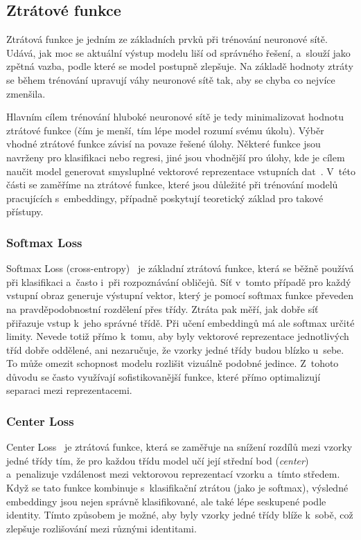 \subsection*{Ztrátové funkce}
Ztrátová funkce je jedním ze základních prvků při trénování neuronové sítě. Udává, jak moc se aktuální výstup modelu liší od správného řešení, a~slouží jako zpětná vazba, podle které se model postupně zlepšuje. Na základě hodnoty ztráty se během trénování upravují váhy neuronové sítě tak, aby se chyba co nejvíce zmenšila.

Hlavním cílem trénování hluboké neuronové sítě je tedy minimalizovat hodnotu ztrátové funkce (čím je menší, tím lépe model rozumí svému úkolu). Výběr vhodné ztrátové funkce závisí na povaze řešené úlohy. Některé funkce jsou navrženy pro klasifikaci nebo regresi, jiné jsou vhodnější pro úlohy, kde je cílem naučit model generovat smysluplné vektorové reprezentace vstupních dat~\cite{lossMetrics}. V~této části se zaměříme na ztrátové funkce, které jsou důležité při trénování modelů pracujících s~embeddingy, případně poskytují teoretický základ pro takové přístupy.

\subsubsection*{Softmax Loss}
Softmax Loss (cross-entropy)~\cite{lossMetrics} je základní ztrátová funkce, která se běžně používá při klasifikaci a~často i~při rozpoznávání obličejů. Síť v~tomto případě pro každý vstupní obraz generuje výstupní vektor, který je pomocí softmax funkce převeden na pravděpodobnostní rozdělení přes třídy. Ztráta pak měří, jak dobře síť přiřazuje vstup k~jeho správné třídě. Při učení embeddingů má ale softmax určité limity. Nevede totiž přímo k~tomu, aby byly vektorové reprezentace jednotlivých tříd dobře oddělené, ani nezaručuje, že vzorky jedné třídy budou blízko u~sebe. To může omezit schopnost modelu rozlišit vizuálně podobné jedince. Z~tohoto důvodu se často využívají sofistikovanější funkce, které přímo optimalizují separaci mezi reprezentacemi.

\subsubsection*{Center Loss}
Center Loss~\cite{lossMetrics} je ztrátová funkce, která se zaměřuje na snížení rozdílů mezi vzorky jedné třídy tím, že pro každou třídu model učí její střední bod (\emph{center}) a~penalizuje vzdálenost mezi vektorovou reprezentací vzorku a~tímto středem. Když se tato funkce kombinuje s~klasifikační ztrátou (jako je softmax), výsledné embeddingy jsou nejen správně klasifikované, ale také lépe seskupené podle identity. Tímto způsobem je možné, aby byly vzorky jedné třídy blíže k~sobě, což zlepšuje rozlišování mezi různými identitami.

